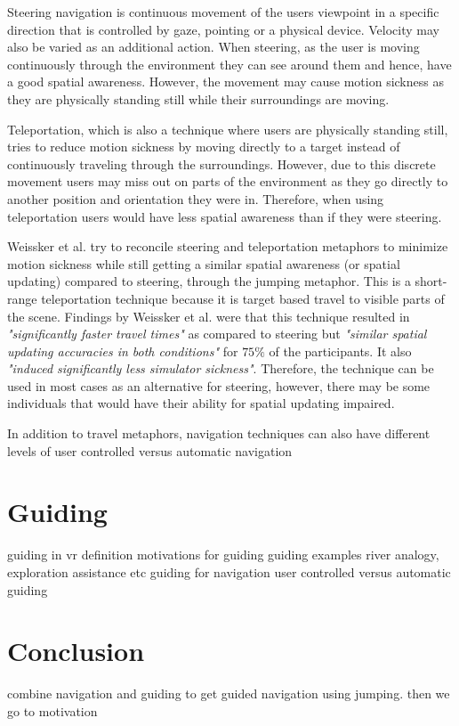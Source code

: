 Steering navigation is continuous movement of the users viewpoint in a specific direction that is controlled by gaze, pointing or a physical device. Velocity may also be varied as an additional action. When steering, as the user is moving continuously through the environment they can see around them and hence, have a good spatial awareness. However, the movement may cause motion sickness as they are physically standing still while their surroundings are moving.

Teleportation, which is also a technique where users are physically standing still, tries to reduce motion sickness by moving directly to a target instead of continuously traveling through the surroundings. However, due to this discrete movement users may miss out on parts of the environment as they go directly to another position and orientation they were in. Therefore, when using teleportation users would have less spatial awareness than if they were steering.

Weissker et al. try to reconcile steering and teleportation metaphors to minimize motion sickness while still getting a similar spatial awareness (or spatial updating) compared to steering, through the jumping metaphor. This is a short-range teleportation technique because it is target based travel to visible parts of the scene. Findings by Weissker et al. were that this technique resulted in \textit{"significantly faster travel times"} as compared to steering but \textit{"similar spatial updating accuracies in both conditions"} for $75\%$ of the participants. It also \textit{"induced significantly less	simulator sickness"}. Therefore, the technique can be used in most cases as an alternative for steering, however, there may be some individuals that would have their ability for spatial updating impaired\cite{Weissker2018}.

In addition to travel metaphors, navigation techniques can also have different levels of 
user controlled versus automatic navigation


\section{Guiding}
\label{section:RW Guiding}
guiding in vr definition
motivations for guiding
guiding examples
river analogy, exploration assistance etc
guiding for navigation
user controlled versus automatic guiding

\section{Conclusion}
\label{section:RW Conclusion}
combine navigation and guiding to get guided navigation using jumping. then we go to motivation